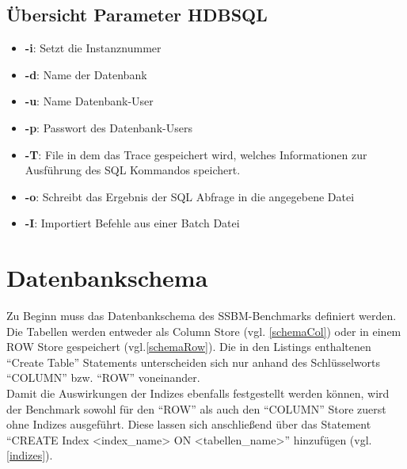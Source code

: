 \subsection{Übersicht Parameter HDBSQL}
\begin{itemize}
	\item \textbf{-i}: Setzt die Instanznummer
	\item \textbf{-d}: Name der Datenbank
	\item \textbf{-u}: Name Datenbank-User
	\item \textbf{-p}: Passwort des Datenbank-Users
	\item \textbf{-T}: File in dem das Trace gespeichert wird, welches Informationen zur Ausführung des SQL Kommandos speichert.
	\item \textbf{-o}: Schreibt das Ergebnis der SQL Abfrage in die angegebene Datei
	\item \textbf{-I}: Importiert Befehle aus einer Batch Datei
\end{itemize}




\section{Datenbankschema}
Zu Beginn muss das Datenbankschema des SSBM-Benchmarks definiert werden. Die Tabellen werden entweder als Column Store (vgl. \autoref{schemaCol})  oder in einem ROW Store gespeichert (vgl.\autoref{schemaRow}). Die in den Listings enthaltenen \enquote{Create Table} Statements unterscheiden sich nur anhand des Schlüsselworts \enquote{COLUMN} bzw. \enquote{ROW} voneinander. 
\\Damit die Auswirkungen der Indizes ebenfalls festgestellt werden können, wird der Benchmark sowohl für den \enquote{ROW} als auch den \enquote{COLUMN} Store zuerst ohne Indizes ausgeführt. Diese lassen sich anschließend über das Statement \enquote{CREATE Index <index\_name> ON <tabellen\_name>} hinzufügen (vgl. \autoref{indizes}).

